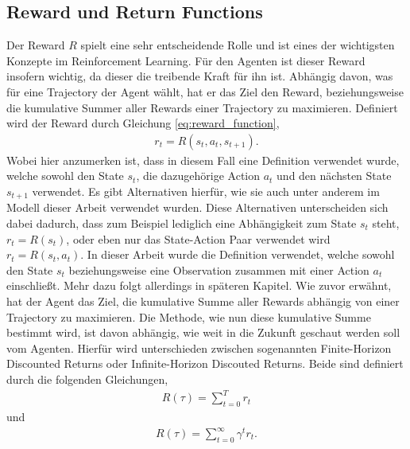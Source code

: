 \documentclass[]{iat}
\begin{document}
\subsection{Reward und Return Functions} \label{sec:reward}
Der Reward $R$ spielt eine sehr entscheidende Rolle und ist eines der wichtigsten Konzepte im Reinforcement Learning. Für den Agenten ist dieser Reward insofern wichtig, da dieser die treibende Kraft für ihn ist. Abhängig davon, was für eine Trajectory der Agent wählt, hat er das Ziel den Reward, beziehungsweise die kumulative Summer aller Rewards einer Trajectory zu maximieren. Definiert wird der Reward durch Gleichung \ref{eq:reward_function},
\begin{align}
    r_t = R(s_t, a_t, s_{t+1}) \label{eq:reward_function}.
\end{align}
Wobei hier anzumerken ist, dass in diesem Fall eine Definition verwendet wurde, welche sowohl den State $s_t$, die dazugehörige Action $a_t$ und den nächsten State $s_{t+1}$ verwendet. Es gibt Alternativen hierfür, wie sie auch unter anderem im Modell dieser Arbeit verwendet wurden. Diese Alternativen unterscheiden sich dabei dadurch, dass zum Beispiel lediglich eine Abhängigkeit zum State $s_t$ steht, $r_t = R(s_t)$, oder eben nur das State-Action Paar verwendet wird $r_t = R(s_t, a_t)$. In dieser Arbeit wurde die Definition verwendet, welche sowohl den State $s_t$ beziehungsweise eine Observation zusammen mit einer Action $a_t$ einschließt. Mehr dazu folgt allerdings in späteren Kapitel. Wie zuvor erwähnt, hat der Agent das Ziel, die kumulative Summe aller Rewards abhängig von einer Trajectory zu maximieren. Die Methode, wie nun diese kumulative Summe bestimmt wird, ist davon abhängig, wie weit in die Zukunft geschaut werden soll vom Agenten. Hierfür wird unterschieden zwischen sogenannten Finite-Horizon Discounted Returns oder Infinite-Horizon Discouted Returns. Beide sind definiert durch die folgenden Gleichungen,
\begin{align}
    R(\tau) = \sum_{t = 0}^{T} r_t \label{eq:finite_horizon_undiscounted}
\end{align}
und
\begin{align}
    R(\tau) = \sum_{t = 0}^{\infty} \gamma^t r_t. \label{eq:infinite_horizon_discounted}
\end{align}
\end{document}
